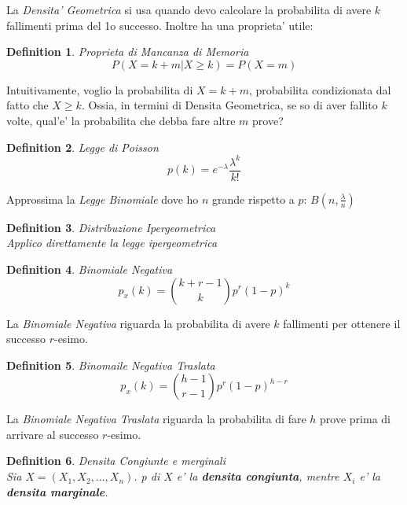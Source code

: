 \documentclass{article}
\newtheorem{definition}{Definition}[section]
\begin{document}
    La \textit{Densita' Geometrica} si usa quando devo calcolare la probabilita di avere $k$ fallimenti
    prima del 1o successo. Inoltre ha una proprieta' utile:

    \begin{definition} Proprieta di Mancanza di Memoria
        $$
        P(X=k+m|X\geq k) = P(X=m)
        $$
    \end{definition}

    Intuitivamente, voglio la probabilita di $X=k+m$, probabilita condizionata dal fatto che $X \geq k$. 
    Ossia, in termini di Densita Geometrica, se so di aver fallito $k$ volte, qual'e' la probabilita che debba 
    fare altre $m$ prove?

    \begin{definition} Legge di Poisson
        $$
        p(k) = e^{-\lambda} \frac{\lambda^k}{k!}
        $$
    \end{definition}

    Approssima la \textit{Legge Binomiale} dove ho $n$ grande rispetto a $p$: $B(n,\frac{\lambda}{n})$

    \begin{definition} Distribuzione Ipergeometrica \\
        Applico direttamente la legge ipergeometrica
    \end{definition}

    \begin{definition} Binomiale Negativa
        $$
        p_x(k) = \binom{k+r-1}{k}p^r(1-p)^k
        $$
    \end{definition}

    La \textit{Binomiale Negativa} riguarda la probabilita di avere $k$ fallimenti per ottenere il successo $r$-esimo.

    \begin{definition} Binomaile Negativa Traslata
        $$
        p_x(k) = \binom{h-1}{r-1} p^r (1-p)^{h-r}
        $$
    \end{definition}

    La \textit {Binomiale Negativa Traslata} riguarda la probabilita di fare $h$ prove prima di arrivare al successo $r$-esimo.

    \begin{definition} Densita Congiunte e merginali\\
        Sia $X=(X_1, X_2, \dots, X_n)$. p di $X$ e' la \textbf{densita congiunta}, mentre $X_i$ e' la 
        \textbf{densita marginale}.
    \end{definition}
\end{document}
